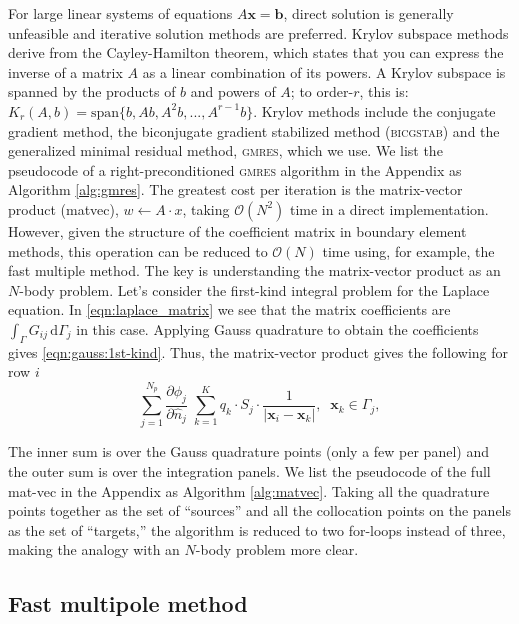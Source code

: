 \documentclass[final,leqno,]{siamltex1213}
\renewcommand{\O}[1]{\mathcal{O}(#1)}
\newcommand{\gmres}{\textsc{gmres}\xspace}
\newcommand{\di}[1]{\text{d}#1}
\newcommand{\partiald}[2]{\frac{\partial #1}{\partial #2}}
\newcommand{\nhat}{\hat{n}}
\newcommand{\vect}[1]{\mathbf{#1}}
\begin{document}
For large linear systems of equations $A\vect{x}=\vect{b}$, direct solution is generally unfeasible and iterative solution methods are preferred. Krylov subspace methods derive from the Cayley-Hamilton theorem, which states that you can express the inverse of a  matrix $A$ as a linear combination of its powers. A Krylov subspace is spanned by the products of $b$ and powers of $A$; to order-$r$, this is: $K_{r}(A,b) = \text{span}\{ b, Ab, A^{2}b, ..., A^{r-1}b\}$.
Krylov methods include the conjugate gradient method, the biconjugate gradient stabilized method (\textsc{bicgstab}) and the generalized minimal residual method, \gmres \cite{SaadSchultz1986}, which we use. We list the pseudocode of a right-preconditioned {\gmres} algorithm in the Appendix as Algorithm \ref{alg:gmres}. The greatest cost per iteration is the matrix-vector product (matvec), $w\gets A\cdot x$, taking $\O{N^{2}}$ time in a direct implementation. However, given the structure of the coefficient matrix in boundary element methods, this operation can be reduced to $\O{N}$ time using, for example, the fast multiple method.
The key is understanding the matrix-vector product as an $N$-body problem. Let's consider the first-kind integral problem for the Laplace equation. In \eqref{eqn:laplace_matrix} we see that the matrix coefficients are $\int_{\Gamma} G_{ij}\,\di{\Gamma_j}$ in this case. Applying Gauss quadrature to obtain the coefficients gives \eqref{eqn:gauss:1st-kind}. Thus, the matrix-vector product gives the following  for row $i$
%
\begin{equation}\label{eqn:matvec-onerow}
	\sum_{j=1}^{N_p}  \partiald{\phi_j}{\nhat_j}\; \sum_{k=1}^{K} q_k\cdot S_j\cdot \frac{1}{|\vect{x}_i-\vect{x}_k|},\;\;\vect{x}_k \in \Gamma_j, 
\end{equation}

\noindent
The inner sum is over the Gauss quadrature points (only a few per panel) and the outer sum is over the integration panels. We list the pseudocode of the full mat-vec in the Appendix as Algorithm \ref{alg:matvec}. Taking all the quadrature points together as the set of ``sources'' and all the collocation points on the panels as the set of ``targets,'' the algorithm is reduced to two for-loops instead of three, making the analogy with an $N$-body problem more clear.


\subsection{Fast multipole method}
\end{document}
